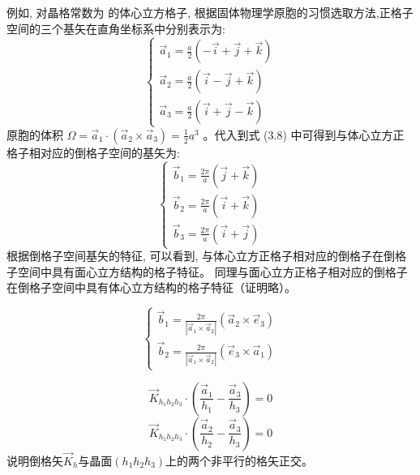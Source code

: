 \documentclass[UTF8,12pt, a4paper, oneside]{ctexart}
\begin{document}
    {例如, 对晶格常数为  的体心立方格子, 根据固体物理学原胞的习惯选取方法,正格子空间的三个基矢在直角坐标系中分别表示为:$$
        \left\{\begin{array}{l}
        \vec{a}_{1}=\frac{a}{2}(-\vec{i}+\vec{j}+\vec{k}) \\
        \vec{a}_{2}=\frac{a}{2}(\vec{i}-\vec{j}+\vec{k}) \\
        \vec{a}_{3}=\frac{a}{2}(\vec{i}+\vec{j}-\vec{k})
        \end{array}\right.
        $$
        原胞的体积 $\Omega=\vec{a}_{1} \cdot\left(\vec{a}_{2} \times \vec{a}_{3}\right)=\frac{1}{2} {a}^{3}$ 。代入到式 (3.8) 中可得到与体心立方正 格子相对应的倒格子空间的基矢为:
        $$
        \left\{\begin{array}{l}
        \vec{b}_{1}=\frac{2 \pi}{a}(\vec{j}+\vec{k}) \\
        \vec{b}_{2}=\frac{2 \pi}{a}(\vec{i}+\vec{k}) \\
        \vec{b}_{3}=\frac{2 \pi}{a}(\vec{i}+\vec{j})
        \end{array}\right.
        $$根据倒格子空间基矢的特征, 可以看到, 与体心立方正格子相对应的倒格子在倒格子空间中具有面心立方结构的格子特征。
        同理与面心立方正格子相对应的倒格子在倒格子空间中具有体心立方结构的格子特征（证明略）。}

    {\[\left\{\begin{array}{l}
            \vec{b}_{1}=\frac{2 \pi}{|\vec{a}_{1} \times \vec{a}_{2}|}(\vec{a}_{2} \times \vec{e}_{3}) \\
            \vec{b}_{2}=\frac{2 \pi}{|\vec{a}_{1} \times \vec{a}_{2}|}(\vec{e}_{3} \times \vec{a}_{1})
            \end{array}\right.\]}
  
    {\[\vec{K}_{h_{1} h_{2} h_{3}} \cdot(\frac{\vec{a}_{1}}{h_{1}}-\frac{\vec{a}_{3}}{h_{3}})=0\]
        \[\vec{K}_{h_{1} h_{2} h_{3}} \cdot(\frac{\vec{a}_{2}}{h_{2}}-\frac{\vec{a}_{3}}{h_{3}})=0
        \]说明倒格矢$\vec{K}_{h}$与晶面$(h_1h_2h_3)$上的两个非平行的格矢正交。}
\end{document}
